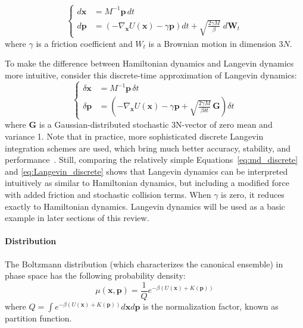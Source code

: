 \documentclass[9pt,review]{livecoms}
\newcommand{\vx}{\mathbf{x}}
\newcommand{\vp}{\mathbf{p}}
\begin{document}
\begin{equation}
\left\{
\begin{array}{ll}
    d\vx &= M^{-1} \vp \,  dt \\
    d\vp &= \left(-\nabla_\vx U(\vx) - \gamma \vp \right) dt
    + \sqrt{ \frac{2 \gamma M}{\beta}} \; d\mathbf{W}_t
\end{array}
\right.
\end{equation}
where $\gamma$ is a friction coefficient and ${W}_t$ is a Brownian motion in dimension $3N$.

To make the difference between Hamiltonian dynamics and Langevin dynamics more intuitive, consider this discrete-time approximation of Langevin dynamics:
\begin{equation}
\left\{
\begin{array}{ll}
    \delta\vx &= M^{-1} \vp \, \delta t \\
    \delta\vp &= \left(-\nabla_\vx U(\vx) - \gamma \vp + \sqrt{ \frac{2 \gamma M}{ \beta \delta t}} \, \mathbf{G} \right) \delta t
    \label{eq:Langevin_discrete}
\end{array}
\right.
\end{equation}
where $\mathbf{G}$ is a Gaussian-distributed stochastic 3N-vector of zero mean and variance 1.
Note that in practice, more sophisticated discrete Langevin integration schemes are used, which bring much better accuracy, stability, and performance~\cite{Skeel2002, Leimkuhler2012}.
Still, comparing the relatively simple Equations~\ref{eq:md_discrete} and \ref{eq:Langevin_discrete} shows that Langevin dynamics can be interpreted intuitively as similar to Hamiltonian dynamics, but including a modified force with added friction and stochastic collision terms. When $\gamma$ is zero, it reduces exactly to Hamiltonian dynamics.
Langevin dynamics will be used as a basic example in later sections of this review.

\hypertarget{ref:Distribution}{\paragraph{Distribution}}

The Boltzmann distribution (which characterizes the canonical ensemble) in phase space has the following probability density:
\begin{equation}
\mu(\vx, \vp) = \frac{1}{Q} e^{-\beta (U(\vx) + K(\vp))}
\label{eq:BoltzmannDistr}
\end{equation}
where $ \displaystyle Q = \int e^{-\beta (U(\vx) + K(\vp))} d\vx d\vp$ is the normalization factor, known as partition function.
\end{document}
